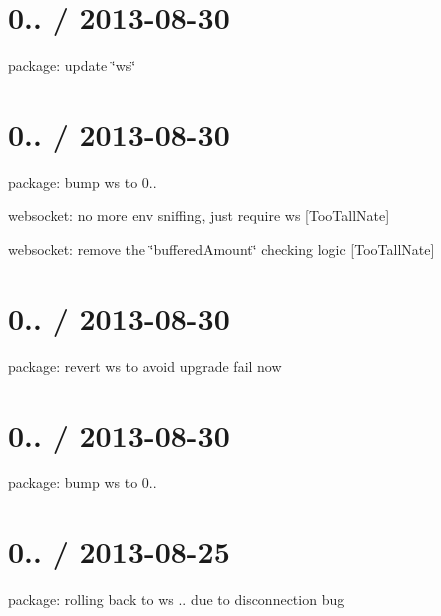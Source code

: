 \section*{0.. / 2013-\/08-\/30 }


\begin{DoxyItemize}
\item package\+: update \char`\"{}ws\char`\"{}
\end{DoxyItemize}

\section*{0.. / 2013-\/08-\/30 }


\begin{DoxyItemize}
\item package\+: bump ws to 0..
\item websocket\+: no more env sniffing, just require {\ttfamily ws} \mbox{[}Too\+Tall\+Nate\mbox{]}
\item websocket\+: remove the \char`\"{}buffered\+Amount\char`\"{} checking logic \mbox{[}Too\+Tall\+Nate\mbox{]}
\end{DoxyItemize}

\section*{0.. / 2013-\/08-\/30 }


\begin{DoxyItemize}
\item package\+: revert ws to avoid upgrade fail now
\end{DoxyItemize}

\section*{0.. / 2013-\/08-\/30 }


\begin{DoxyItemize}
\item package\+: bump ws to 0..
\end{DoxyItemize}

\section*{0.. / 2013-\/08-\/25 }


\begin{DoxyItemize}
\item package\+: rolling back to {\ttfamily ws} {..} due to disconnection bug
\end{DoxyItemize}

